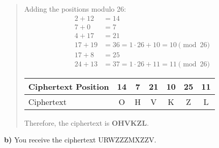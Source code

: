 \documentclass[12pt]{article}
\begin{document}
\begin{quote}
\vspace{0.5cm}

Adding the positions modulo 26:
\begin{align*}
2 + 12 &= 14\\
7 + 0 &= 7\\
4 + 17 &= 21\\
17 + 19 &= 36 = 1 \cdot 26 + 10 = 10 \pmod{26}\\
17 + 8 &= 25\\
24 + 13 &= 37 = 1 \cdot 26 + 11 = 11 \pmod{26}
\end{align*}

\vspace{0.5cm}

\begin{center}
\begin{tabular}{|l|c|c|c|c|c|c|}
\hline
Ciphertext Position & 14 & 7 & 21 & 10 & 25 & 11 \\
\hline
Ciphertext & O & H & V & K & Z & L \\
\hline
\end{tabular}
\end{center}

\vspace{0.5cm}

Therefore, the ciphertext is \textbf{OHVKZL}.

\end{quote}

\vspace{0.5cm}

\noindent\textbf{b)} You receive the ciphertext URWZZZMXZZV.

\vspace{0.5cm}
\end{document}
